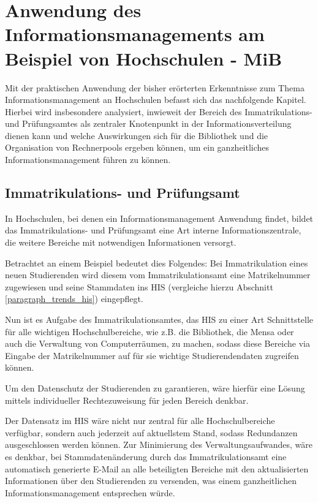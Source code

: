 \section{Anwendung des Informationsmanagements am Beispiel von Hochschulen - MiB}
\label{anwendung_des_inm_auf_hs}
Mit der praktischen Anwendung der bisher erörterten Erkenntnisse zum Thema 
Informationsmanagement an Hochschulen befasst sich das nachfolgende Kapitel. 
Hierbei wird insbesondere analysiert, inwieweit der Bereich des Immatrikulations- und 
Prüfungsamtes als zentraler Knotenpunkt in der Informationsverteilung dienen kann und 
welche Auswirkungen sich für die Bibliothek und die Organisation von Rechnerpools ergeben 
können, um ein ganzheitliches Informationsmanagement führen zu können.

\subsection{Immatrikulations- und Prüfungsamt}
\label{immatrikulations_und_pruefungsamt}
In Hochschulen, bei denen ein Informationsmanagement Anwendung findet, bildet das Immatrikulations- und Prüfungsamt eine Art interne Informationszentrale, die weitere Bereiche mit notwendigen Informationen versorgt. 

Betrachtet an einem Beispiel bedeutet dies Folgendes: Bei Immatrikulation eines neuen Studierenden wird diesem vom Immatrikulationsamt eine Matrikelnummer zugewiesen und seine Stammdaten ins HIS (vergleiche hierzu Abschnitt \ref{paragraph_trends_his}) eingepflegt. 

Nun ist es Aufgabe des Immatrikulationsamtes, das HIS zu einer Art Schnittstelle für alle wichtigen Hochschulbereiche, wie z.B. die Bibliothek, die Mensa oder auch die Verwaltung von Computerräumen, zu machen, sodass diese Bereiche via Eingabe der Matrikelnummer auf für sie wichtige Studierendendaten zugreifen können.

Um den Datenschutz der Studierenden zu garantieren, wäre hierfür eine Lösung mittels individueller Rechtezuweisung für jeden Bereich denkbar.

Der Datensatz im HIS wäre nicht nur zentral für alle Hochschulbereiche verfügbar, sondern 
auch jederzeit auf aktuellstem Stand, sodass Redundanzen ausgeschlossen werden können. 
Zur Minimierung des Verwaltungsaufwandes, wäre es denkbar, bei Stammdatenänderung 
durch das Immatrikulationsamt eine automatisch generierte E-Mail an alle beteiligten 
Bereiche mit den aktualisierten Informationen über den Studierenden zu versenden, was 
einem ganzheitlichen Informationsmanagement entsprechen würde.

